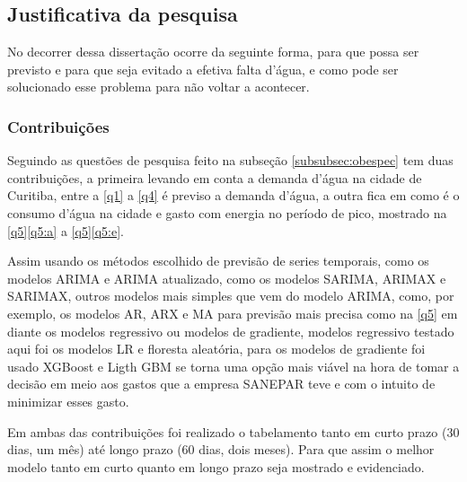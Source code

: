 \subsection{Justificativa da pesquisa} \label{subsec:justif}

No decorrer dessa dissertação ocorre da seguinte forma, para que possa ser previsto e para que seja evitado a efetiva falta d'água, e como pode ser solucionado esse problema para não voltar a acontecer.

\subsubsection{Contribui\c c\~oes} \label{subsubsec:Contribuição}


%

Seguindo as questões de pesquisa feito na subseção \ref{subsubsec:obespec} tem duas contribuições, a primeira levando em conta a demanda d'água na cidade de Curitiba, entre a \ref{q1} a \ref{q4} é previso a demanda d'água, a outra fica em como é o consumo d'água na cidade e gasto com energia no período de pico, mostrado na \ref{q5}\ref{q5:a} a \ref{q5}\ref{q5:e}.

Assim usando os métodos escolhido de previsão de series temporais, como os modelos ARIMA e ARIMA atualizado, como os modelos SARIMA, ARIMAX e SARIMAX, outros modelos mais simples que vem do modelo ARIMA, como, por exemplo, os modelos AR, ARX e MA para previsão mais precisa como na \ref{q5} em diante os modelos regressivo ou modelos de gradiente, modelos regressivo testado aqui foi os modelos LR e floresta aleatória, para os modelos de gradiente foi usado XGBoost e Ligth GBM se torna uma opção mais viável na hora de tomar a decisão em meio aos gastos que a empresa SANEPAR teve e com o intuito de minimizar esses gasto.

Em ambas das contribuições foi realizado o tabelamento tanto em curto prazo (30 dias, um mês) até longo prazo (60 dias, dois meses). Para que assim o melhor modelo tanto em curto quanto em longo prazo seja mostrado e evidenciado.